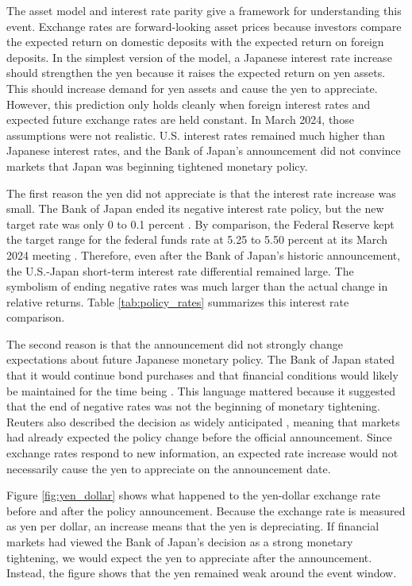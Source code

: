 \documentclass[12pt]{article}
\begin{document}
The asset model and interest rate parity give a framework for understanding this event. Exchange rates are forward-looking asset prices because investors compare the expected return on domestic deposits with the expected return on foreign deposits. In the simplest version of the model, a Japanese interest rate increase should strengthen the yen because it raises the expected return on yen assets. This should increase demand for yen assets and cause the yen to appreciate. However, this prediction only holds cleanly when foreign interest rates and expected future exchange rates are held constant. In March 2024, those assumptions were not realistic. U.S. interest rates remained much higher than Japanese interest rates, and the Bank of Japan's announcement did not convince markets that Japan was beginning tightened monetary policy.

The first reason the yen did not appreciate is that the interest rate increase was small. The Bank of Japan ended its negative interest rate policy, but the new target rate was only 0 to 0.1 percent \citep{boj2024statement}. By comparison, the Federal Reserve kept the target range for the federal funds rate at 5.25 to 5.50 percent at its March 2024 meeting \citep{fed2024statement}. Therefore, even after the Bank of Japan's historic announcement, the U.S.-Japan short-term interest rate differential remained large. The symbolism of ending negative rates was much larger than the actual change in relative returns. Table \ref{tab:policy_rates} summarizes this interest rate comparison.

The second reason is that the announcement did not strongly change expectations about future Japanese monetary policy. The Bank of Japan stated that it would continue bond purchases and that financial conditions would likely be maintained for the time being \citep{boj2024statement}. This language mattered because it suggested that the end of negative rates was not the beginning of monetary tightening. Reuters also described the decision as widely anticipated \citep{reuters2024yen}, meaning that markets had already expected the policy change before the official announcement. Since exchange rates respond to new information, an expected rate increase would not necessarily cause the yen to appreciate on the announcement date.

Figure \ref{fig:yen_dollar} shows what happened to the yen-dollar exchange rate before and after the policy announcement. Because the exchange rate is measured as yen per dollar, an increase means that the yen is depreciating. If financial markets had viewed the Bank of Japan's decision as a strong monetary tightening, we would expect the yen to appreciate after the announcement. Instead, the figure shows that the yen remained weak around the event window.
\end{document}
